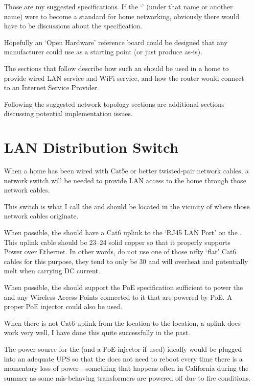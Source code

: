 Those are my suggested specifications. If the `' (under that name or another name) were to
become a standard for home networking, obviously there would have to be discussions about the specification.

Hopefully an `Open Hardware' reference board could be designed that any manufacturer could use as a starting point
(or just produce as-is).

The sections that follow describe how such an  should be used in a home to provide wired LAN
service and WiFi service, and how the router would connect to an Internet Service Provider.

Following the suggested network topology sections are additional sections discussing potential implementation issues.

\section{LAN Distribution Switch}

When a home has been wired with Cat5e or better twisted-pair network cables, a network switch will be needed to
provide LAN access to the home through those network cables.

This switch is what I call the  and should be located in the vicinity of where
those network cables originate.

When possible, the  should have a Cat6 uplink to the `RJ45 LAN Port' on the
. This uplink cable should be \SIrange{23}{24}{\awg} solid copper so that it properly
supports Power over Ethernet. In other words, do not use one of those nifty `flat' Cat6 cables for this purpose,
they tend to only be \SI{30}{\awg} and will overheat and potentially melt when carrying DC current.

When possible, the  should support the PoE specification sufficient to
power the  and any Wireless Access Points connected to it that are powered by PoE. A proper
PoE injector could also be used.

When there is not Cat6 uplink from the  location to the 
location, a  uplink does work very well, I have done this quite successfully in the past.

The power source for the  (and a PoE injector if used) ideally would be plugged
into an adequate UPS so that the  does not need to reboot every time there is a
momentary loss of power---something that happens often in California during the summer as some mis-behaving
transformers are powered off due to fire conditions.

